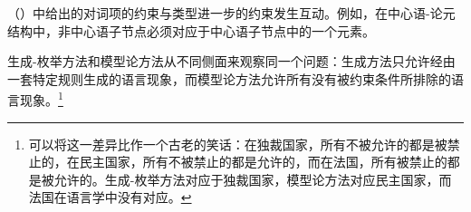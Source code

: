 
（）中给出的对词项的约束与类型进一步的约束发生互动。例如，在中心语-论元结构中，非中心语子节点必须对应于中心语子节点\subcatlc 中的一个元素。

生成-枚举方法和模型论方法从不同侧面来观察同一个问题：生成方法只允许经由一套特定规则生成的语言现象，而模型论方法允许所有没有被约束条件所排除的语言现象。\footnote{%
可以将这一差异比作一个古老的笑话：在独裁国家，所有不被允许的都是被禁止的，在民主国家，所有不被禁止的都是允许的，而在法国，所有被禁止的都是被允许的。生成-枚举方法对应于独裁国家，模型论方法对应民主国家，而法国在语言学中没有对应。
}

